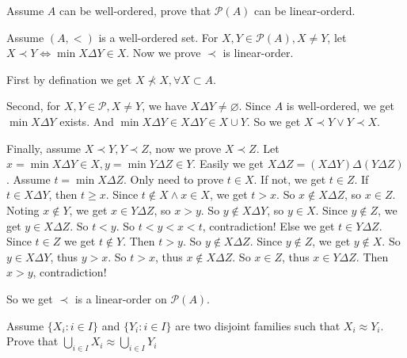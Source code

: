 \documentclass{ctexart}
\newif\ifpreface
\begin{document}
\large
\setlength{\baselineskip}{1.2em}
\ifpreface
    
\else
\maketitle
\fi
{}
\begin{problem}
  Assume \(A\) can be well-ordered, prove that \(\mathcal{P}(A)\) can be linear-orderd. 
\end{problem}
\begin{solution}
  Assume \((A,<)\) is a well-ordered set. 
  For \(X,Y \in \mathcal{P}(A),X \neq Y\), let \(X \prec Y \iff \min X \Delta Y \in X\). Now we prove \(\prec\) is linear-order. 
  
  First by defination we get \(X \not \prec X,\forall X \subset A\). 

  Second, for \(X,Y \in \mathcal{P},X \neq Y\), we have \(X \Delta Y \neq \varnothing\). 
  Since \(A\) is well-ordered, we get \(\min X \Delta Y\) exists. 
  And \(\min X \Delta Y \in X \Delta Y \in X \cup Y\). 
  So we get \(X \prec Y \vee Y \prec X\). 

  Finally, assume \(X \prec Y,Y \prec Z\), now we prove \(X \prec Z\). 
  Let \(x = \min X \Delta Y \in X,y=\min Y \Delta Z \in Y\). 
  Easily we get \(X \Delta Z = (X \Delta Y)\Delta (Y \Delta Z)\). 
  Assume \(t = \min X \Delta Z\). Only need to prove \(t \in X\). If not, we get \(t \in Z\). 
  If \(t \in X \Delta Y\), then \(t \geq x\). Since \(t \notin X \wedge x \in X\), we get \(t>x\). 
  So \(x \notin X \Delta Z\), so \(x \in Z\). Noting \(x \notin Y\), we get \(x \in Y \Delta Z\), so \(x >y\). 
  So \(y \notin X \Delta Y\), so \(y \in X\). Since \(y \notin Z\), we get \(y \in X \Delta Z\). 
  So \(t<y\). So \(t<y<x<t\), contradiction! 
  Else we get \(t \in Y \Delta Z\). Since \(t \in Z\) we get \(t \notin Y\). Then \(t>y\). 
  So \(y \notin X \Delta Z\). Since \(y \notin Z\), we get \(y \notin X\). 
  So \(y \in X \Delta Y\), thus \(y>x\). So \(t>x\), thus \(x \notin X \Delta Z\). 
  So \(x \in Z\), thus \(x \in Y \Delta Z\). Then \(x > y\), contradiction! 

  So we get \(\prec\) is a linear-order on \(\mathcal{P}(A)\). 
\end{solution}

\begin{problem}
  Assume \(\{X_i:i \in I\}\) and \(\{Y_i:i \in I\}\) are two disjoint families such that \(X_i \approx Y_i\). 
  Prove that \(\bigcup_{i \in I}X_i \approx \bigcup_{ i \in I} Y_i\)
\end{problem}
\end{document}
